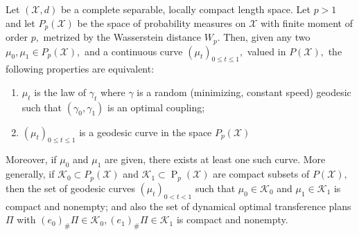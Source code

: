 \begin{thm}
	\label{geodesic_Wasserstein_space}
	Let \( ( \mathcal { X } , d ) \) be a complete separable, locally compact length space. Let \( p > 1 \) and let \( P _ { p } ( \mathcal { X } ) \) be the space of probability measures on \( \mathcal { X } \) with finite moment of order \( p , \) metrized by the Wasserstein distance \( W _ { p } . \) Then, given any two \( \mu _ { 0 } , \mu _ { 1 } \in P _ { p } ( \mathcal { X } ) , \) and a continuous curve \( \left( \mu _ { t } \right) _ { 0 \leq t \leq 1 } , \) valued in \( P ( \mathcal { X } ) , \) the following properties are equivalent:
	\begin{enumerate}
		\item \( \mu _ { t } \) is the law of \(\gamma _ { t } \) where \( \gamma \) is a random (minimizing, constant speed) geodesic such that \( \left( \gamma _ { 0 } , \gamma _ { 1 } \right) \) is an optimal coupling;
		\item \( \left( \mu _ { t } \right) _ { 0 \leq t \leq 1 } \) is a geodesic curve in the space \( P _ { p } ( \mathcal { X } ) \)
	\end{enumerate}
	Moreover, if \( \mu _ { 0 } \) and \( \mu _ { 1 } \) are given, there exists at least one such curve.
	More generally, if \( \mathcal { K } _ { 0 } \subset P _ { p } ( \mathcal { X } ) \) and \( \mathcal { K } _ { 1 } \subset \operatorname { P } _ { p } ( \mathcal { X } ) \) are compact subsets of
	\( P ( \mathcal { X } ) , \) then the set of geodesic curves \( \left( \mu _ { t } \right) _ { 0 < t < 1 } \) such that \( \mu _ { 0 } \in \mathcal { K } _ { 0 } \) and
	\( \mu _ { 1 } \in \mathcal { K } _ { 1 } \) is compact and nonempty; and also the set of dynamical optimal transference plans \( \Pi \) with \( \left( e _ { 0 } \right) _ { \# } \Pi \in \mathcal { K } _ { 0 } , \left( e _ { 1 } \right) _ { \# } \Pi \in \mathcal { K } _ { 1 } \) is compact
	and nonempty.
\end{thm}



